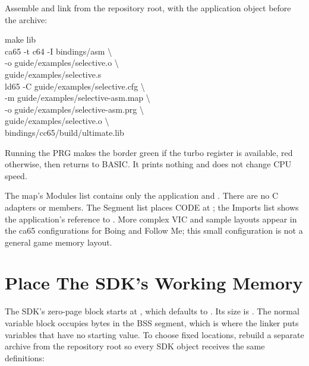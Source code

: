 Assemble and link from the repository root, with the application object before
the archive:
\begin{listingbox}
make lib\\
ca65 -t c64 -I bindings/asm \textbackslash\\
\hspace*{1em}-o guide/examples/selective.o \textbackslash\\
\hspace*{1em}guide/examples/selective.s\\
ld65 -C guide/examples/selective.cfg \textbackslash\\
\hspace*{1em}-m guide/examples/selective-asm.map \textbackslash\\
\hspace*{1em}-o guide/examples/selective-asm.prg \textbackslash\\
\hspace*{1em}guide/examples/selective.o \textbackslash\\
\hspace*{1em}bindings/cc65/build/ultimate.lib
\end{listingbox}

\begin{resultbox}
Running the PRG makes the border green if the turbo register is available,
red otherwise, then returns to BASIC. It prints nothing and does not change
CPU speed.
\end{resultbox}

The map's Modules list contains only the application and
. There are no C adapters or  members.
The Segment list places CODE at ; the Imports list shows the
application's reference to . More complex
VIC and sample layouts appear in the ca65 configurations for Boing and
Follow Me; this small configuration is not a general game memory layout.


\section{Place The SDK's Working Memory}

The SDK's zero-page block starts at , which defaults to
. Its size is . The normal variable block occupies
 bytes in the BSS segment, which is where the linker puts
variables that have no starting value. To choose fixed locations, rebuild a
separate archive from the repository root so every SDK object receives the
same definitions:

